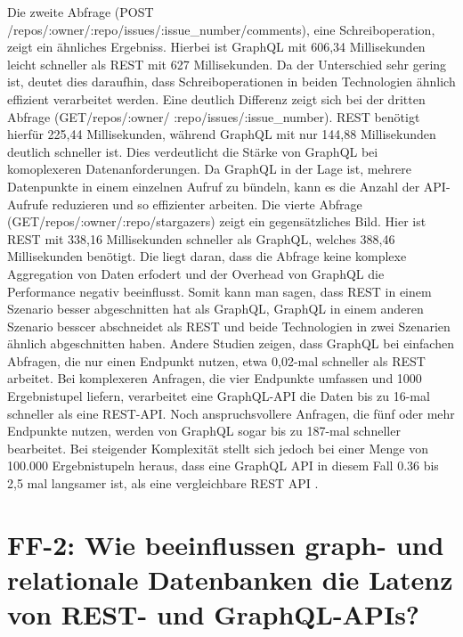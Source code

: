 Die zweite Abfrage (POST /repos/:owner/:repo/issues/:issue\_number/comments), eine Schreiboperation, zeigt ein ähnliches Ergebniss. Hierbei ist GraphQL mit 606,34 Millisekunden leicht schneller als REST mit 627 Millisekunden. Da der Unterschied sehr gering ist, deutet dies daraufhin, dass Schreiboperationen in beiden Technologien ähnlich effizient verarbeitet werden.
Eine deutlich Differenz zeigt sich bei der dritten Abfrage (GET/repos/:owner/ :repo/issues/:issue\_number). REST benötigt hierfür 225,44 Millisekunden, während GraphQL mit nur 144,88 Millisekunden deutlich schneller ist. Dies verdeutlicht die Stärke von GraphQL bei komoplexeren Datenanforderungen. Da GraphQL in der Lage ist, mehrere Datenpunkte in einem einzelnen Aufruf zu bündeln, kann es die Anzahl der API-Aufrufe reduzieren und so effizienter arbeiten.
Die vierte Abfrage (GET/repos/:owner/:repo/stargazers) zeigt ein gegensätzliches Bild. Hier ist REST mit 338,16 Millisekunden schneller als GraphQL, welches 388,46 Millisekunden benötigt. Die liegt daran, dass die Abfrage keine komplexe Aggregation von Daten erfodert und der Overhead von GraphQL die Performance negativ beeinflusst.
Somit kann man sagen, dass REST in einem Szenario besser abgeschnitten hat als GraphQL, GraphQL in einem anderen Szenario besscer abschneidet als REST und beide Technologien in zwei Szenarien ähnlich abgeschnitten haben. 
\citep{graphqlreplacerest}
\newline
Andere Studien zeigen, dass GraphQL bei einfachen Abfragen, die nur einen Endpunkt nutzen, etwa 0,02-mal schneller als REST arbeitet. \citep{migrategraphql}
Bei komplexeren Anfragen, die vier Endpunkte umfassen und 1000 Ergebnistupel liefern, verarbeitet eine GraphQL-API die Daten bis zu 16-mal schneller als eine REST-API.\citep{analysegraphql}
Noch anspruchsvollere Anfragen, die fünf oder mehr Endpunkte nutzen, werden von GraphQL sogar bis zu 187-mal schneller bearbeitet.\citep{analysewebgraphql}
Bei steigender Komplexität stellt sich jedoch bei einer Menge von 100.000 Ergebnistupeln heraus, dass eine GraphQL API in diesem Fall 0.36 \citep{analysegraphql} bis 2,5 mal langsamer ist, als eine vergleichbare REST API \citep{restvsgraphql}.




\section{FF-2: Wie beeinflussen graph- und relationale Datenbanken die Latenz von REST- und GraphQL-APIs?} %
\label{sec:ff2}







